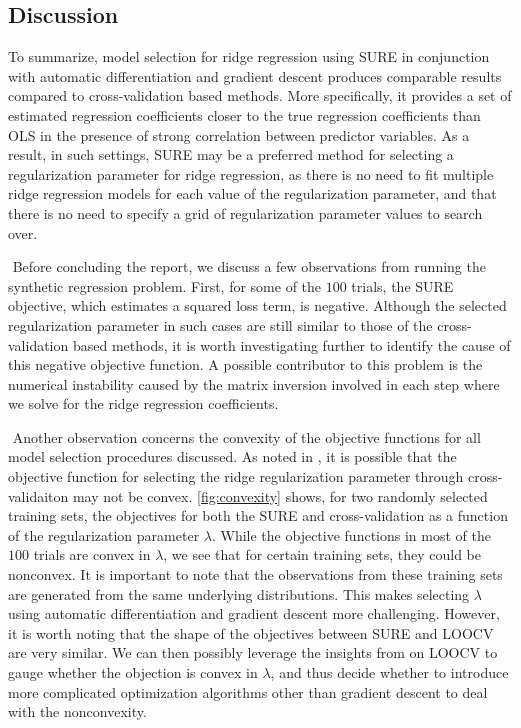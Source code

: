 \subsection{Discussion}
To summarize, model selection for ridge regression using SURE in conjunction with automatic differentiation and gradient descent produces comparable results compared to cross-validation based methods. More specifically, it provides a set of estimated regression coefficients closer to the true regression coefficients than OLS in the presence of strong correlation between predictor variables. As a result, in such settings, SURE may be a preferred method for selecting a regularization parameter for ridge regression, as there is no need to fit multiple ridge regression models for each value of the regularization parameter, and that there is no need to specify a grid of regularization parameter values to search over.

$ $\newline
Before concluding the report, we discuss a few observations from running the synthetic regression problem. First, for some of the $100$ trials, the SURE objective, which estimates a squared loss term, is negative. Although the selected regularization parameter in such cases are still similar to those of the cross-validation based methods, it is worth investigating further to identify the cause of this negative objective function. A possible contributor to this problem is the numerical instability caused by the matrix inversion involved in each step where we solve for the ridge regression coefficients.

$ $\newline
Another observation concerns the convexity of the objective functions for all model selection procedures discussed. As noted in \citet{stephenson2021can}, it is possible that the objective function for selecting the ridge regularization parameter through cross-validaiton may not be convex. \cref{fig:convexity} shows, for two randomly selected training sets, the objectives for both the SURE and cross-validation as a function of the regularization parameter $\lambda$. While the objective functions in most of the $100$ trials are convex in $\lambda$, we see that for certain training sets, they could be nonconvex. It is important to note that the observations from these training sets are generated from the same underlying distributions. This makes selecting $\lambda$ using automatic differentiation and gradient descent more challenging. However, it is worth noting that the shape of the objectives between SURE and LOOCV are very similar. We can then possibly leverage the insights from \citet{stephenson2021can} on LOOCV to gauge whether the objection is convex in $\lambda$, and thus decide whether to introduce more complicated optimization algorithms other than gradient descent to deal with the nonconvexity.